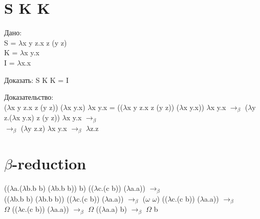 \documentclass[12pt]{article}
\begin{document}
\section*{S K K}

Дано: \\
S = $\lambda$x y z.x z (y z) \\
K = $\lambda$x y.x \\
I = $\lambda$x.x

Доказать: S K K = I

Доказательство:\\
($\lambda$x y z.x z (y z)) ($\lambda$x y.x) $\lambda$x y.x = (($\lambda$x y z.x z (y z)) ($\lambda$x y.x)) $\lambda$x y.x $\rightarrow_\beta$
($\lambda$y z.($\lambda$x y.x) z (y z)) $\lambda$x y.x
$\rightarrow_\beta$ \\
$\rightarrow_\beta$
($\lambda$y z.z) $\lambda$x y.x
$\rightarrow_\beta$
$\lambda$z.z

\section*{$\beta$-reduction}

(($\lambda$a.($\lambda$b.b b) ($\lambda$b.b b)) b) (($\lambda$c.(c b)) ($\lambda$a.a)) 
$\rightarrow_\beta$ \\
(($\lambda$b.b b) ($\lambda$b.b b)) (($\lambda$c.(c b)) ($\lambda$a.a)) 
$\rightarrow_\beta$ 
($\omega$ $\omega$) (($\lambda$c.(c b)) ($\lambda$a.a)) 
$\rightarrow_\beta$ \\
$\Omega$ (($\lambda$c.(c b)) ($\lambda$a.a)) 
$\rightarrow_\beta$ 
$\Omega$ (($\lambda$a.a) b)
$\rightarrow_\beta$ 
$\Omega$ b
\end{document}
